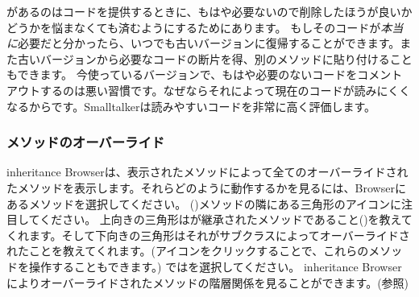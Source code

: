\documentclass[a4paper,10pt,twoside]{book}
\begin{document}
があるのはコードを提供するときに、もはや必要ないので削除したほうが良いかどうかを悩まなくても済むようにするためにあります。
もしそのコードが\emph{本当に}必要だと分かったら、いつでも古いバージョンに復帰することができます。また古いバージョンから必要なコードの断片を得、別のメソッドに貼り付けることもできます。
今使っているバージョンで、もはや必要のないコードをコメントアウトするのは悪い習慣です。なぜならそれによって現在のコードが読みにくくなるからです。Smalltalkerは読みやすいコードを非常に高く評価します。


\subsubsection{メソッドのオーバーライド}

inheritance Browserは、表示されたメソッドによって全てのオーバーライドされたメソッドを表示します。それらどのように動作するかを見るには、Browserにあるメソッドを選択してください。
()メソッドの隣にある三角形のアイコンに注目してください。
上向きの三角形はが継承されたメソッドであること(\ie {})を教えてくれます。そして下向きの三角形はそれがサブクラスによってオーバーライドされたことを教えてくれます。(アイコンをクリックすることで、これらのメソッドを操作することもできます。)
ではを選択してください。
inheritance Browserによりオーバーライドされたメソッドの階層関係を見ることができます。(参照)
\end{document}
